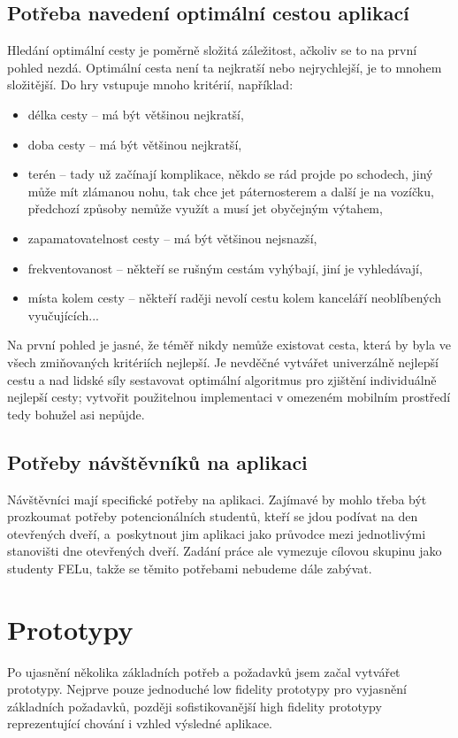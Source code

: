 \subsection{Potřeba navedení optimální cestou aplikací}
\label{subs:UNcestaAplikaci}
Hledání optimální cesty je poměrně složitá záležitost, ačkoliv se to na první pohled nezdá. Optimální cesta není ta nejkratší nebo nejrychlejší, je to mnohem složitější. Do hry vstupuje mnoho kritérií, například:
\begin{itemize}
\item délka cesty -- má být většinou nejkratší,
\item doba cesty -- má být většinou nejkratší,
\item terén -- tady už začínají komplikace, někdo se rád projde po schodech, jiný může mít zlámanou nohu, tak chce jet páternosterem a další je na vozíčku, předchozí způsoby nemůže využít a musí jet obyčejným výtahem,
\item zapamatovatelnost cesty -- má být většinou nejsnazší,
\item frekventovanost -- někteří se rušným cestám vyhýbají, jiní je vyhledávají,
\item místa kolem cesty -- někteří raději nevolí cestu kolem kanceláří neoblíbených vyučujících...
\end{itemize}
Na první pohled je jasné, že téměř nikdy nemůže existovat cesta, která by byla ve všech zmiňovaných kritériích nejlepší. Je nevděčné vytvářet univerzálně nejlepší cestu a nad lidské síly sestavovat optimální algoritmus pro zjištění individuálně nejlepší cesty; vytvořit použitelnou implementaci v omezeném mobilním prostředí tedy bohužel asi nepůjde.

\subsection{Potřeby návštěvníků na aplikaci}
Návštěvníci mají specifické potřeby na aplikaci. Zajímavé by mohlo třeba být prozkoumat potřeby potencionálních studentů, kteří se jdou podívat na den otevřených dveří, a~poskytnout jim aplikaci jako průvodce mezi jednotlivými stanovišti dne otevřených dveří. Zadání práce ale vymezuje cílovou skupinu jako studenty FELu, takže se těmito potřebami nebudeme dále zabývat.



\section{Prototypy}
Po ujasnění několika základních potřeb a požadavků jsem začal vytvářet prototypy. Nejprve pouze jednoduché low fidelity prototypy pro vyjasnění základních požadavků, později sofistikovanější high fidelity prototypy reprezentující chování i vzhled výsledné aplikace.

